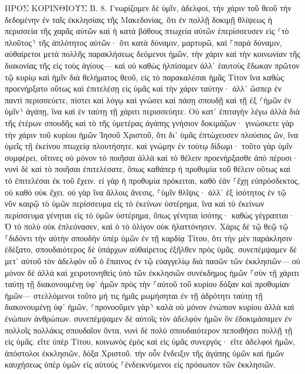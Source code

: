 \documentclass[twoside, 9pt]{extreport}
\begin{document}
ΠΡΟΣ ΚΟΡΙΝΘΙΟΥΣ Β.
8.
Γνωρίζομεν δὲ ὑμῖν, ἀδελφοί, τὴν χάριν τοῦ θεοῦ τὴν δεδομένην ἐν ταῖς ἐκκλησίαις τῆς Μακεδονίας, 
ὅτι ἐν πολλῇ δοκιμῇ θλίψεως ἡ περισσεία τῆς χαρᾶς αὐτῶν καὶ ἡ κατὰ βάθους πτωχεία αὐτῶν ἐπερίσσευσεν εἰς ⸂τὸ πλοῦτος⸃ τῆς ἁπλότητος αὐτῶν· 
ὅτι κατὰ δύναμιν, μαρτυρῶ, καὶ ⸀παρὰ δύναμιν, αὐθαίρετοι 
μετὰ πολλῆς παρακλήσεως δεόμενοι ἡμῶν, τὴν χάριν καὶ τὴν κοινωνίαν τῆς διακονίας τῆς εἰς τοὺς ἁγίους— 
καὶ οὐ καθὼς ἠλπίσαμεν ἀλλ᾽ ἑαυτοὺς ἔδωκαν πρῶτον τῷ κυρίῳ καὶ ἡμῖν διὰ θελήματος θεοῦ, 
εἰς τὸ παρακαλέσαι ἡμᾶς Τίτον ἵνα καθὼς προενήρξατο οὕτως καὶ ἐπιτελέσῃ εἰς ὑμᾶς καὶ τὴν χάριν ταύτην· 
ἀλλ᾽ ὥσπερ ἐν παντὶ περισσεύετε, πίστει καὶ λόγῳ καὶ γνώσει καὶ πάσῃ σπουδῇ καὶ τῇ ἐξ ⸂ἡμῶν ἐν ὑμῖν⸃ ἀγάπῃ, ἵνα καὶ ἐν ταύτῃ τῇ χάριτι περισσεύητε. 
Οὐ κατ᾽ ἐπιταγὴν λέγω ἀλλὰ διὰ τῆς ἑτέρων σπουδῆς καὶ τὸ τῆς ὑμετέρας ἀγάπης γνήσιον δοκιμάζων· 
γινώσκετε γὰρ τὴν χάριν τοῦ κυρίου ἡμῶν Ἰησοῦ Χριστοῦ, ὅτι δι᾽ ὑμᾶς ἐπτώχευσεν πλούσιος ὤν, ἵνα ὑμεῖς τῇ ἐκείνου πτωχείᾳ πλουτήσητε. 
καὶ γνώμην ἐν τούτῳ δίδωμι· τοῦτο γὰρ ὑμῖν συμφέρει, οἵτινες οὐ μόνον τὸ ποιῆσαι ἀλλὰ καὶ τὸ θέλειν προενήρξασθε ἀπὸ πέρυσι· 
νυνὶ δὲ καὶ τὸ ποιῆσαι ἐπιτελέσατε, ὅπως καθάπερ ἡ προθυμία τοῦ θέλειν οὕτως καὶ τὸ ἐπιτελέσαι ἐκ τοῦ ἔχειν. 
εἰ γὰρ ἡ προθυμία πρόκειται, καθὸ ἐὰν ⸀ἔχῃ εὐπρόσδεκτος, οὐ καθὸ οὐκ ἔχει. 
οὐ γὰρ ἵνα ἄλλοις ἄνεσις, ⸀ὑμῖν θλῖψις· ἀλλ᾽ ἐξ ἰσότητος 
ἐν τῷ νῦν καιρῷ τὸ ὑμῶν περίσσευμα εἰς τὸ ἐκείνων ὑστέρημα, ἵνα καὶ τὸ ἐκείνων περίσσευμα γένηται εἰς τὸ ὑμῶν ὑστέρημα, ὅπως γένηται ἰσότης· 
καθὼς γέγραπται· Ὁ τὸ πολὺ οὐκ ἐπλεόνασεν, καὶ ὁ τὸ ὀλίγον οὐκ ἠλαττόνησεν. 
Χάρις δὲ τῷ θεῷ τῷ ⸀διδόντι τὴν αὐτὴν σπουδὴν ὑπὲρ ὑμῶν ἐν τῇ καρδίᾳ Τίτου, 
ὅτι τὴν μὲν παράκλησιν ἐδέξατο, σπουδαιότερος δὲ ὑπάρχων αὐθαίρετος ἐξῆλθεν πρὸς ὑμᾶς. 
συνεπέμψαμεν δὲ μετ᾽ αὐτοῦ τὸν ἀδελφὸν οὗ ὁ ἔπαινος ἐν τῷ εὐαγγελίῳ διὰ πασῶν τῶν ἐκκλησιῶν— 
οὐ μόνον δὲ ἀλλὰ καὶ χειροτονηθεὶς ὑπὸ τῶν ἐκκλησιῶν συνέκδημος ἡμῶν ⸀σὺν τῇ χάριτι ταύτῃ τῇ διακονουμένῃ ὑφ᾽ ἡμῶν πρὸς τὴν ⸀αὐτοῦ τοῦ κυρίου δόξαν καὶ προθυμίαν ἡμῶν— 
στελλόμενοι τοῦτο μή τις ἡμᾶς μωμήσηται ἐν τῇ ἁδρότητι ταύτῃ τῇ διακονουμένῃ ὑφ᾽ ἡμῶν, 
⸂προνοοῦμεν γὰρ⸃ καλὰ οὐ μόνον ἐνώπιον κυρίου ἀλλὰ καὶ ἐνώπιον ἀνθρώπων. 
συνεπέμψαμεν δὲ αὐτοῖς τὸν ἀδελφὸν ἡμῶν ὃν ἐδοκιμάσαμεν ἐν πολλοῖς πολλάκις σπουδαῖον ὄντα, νυνὶ δὲ πολὺ σπουδαιότερον πεποιθήσει πολλῇ τῇ εἰς ὑμᾶς. 
εἴτε ὑπὲρ Τίτου, κοινωνὸς ἐμὸς καὶ εἰς ὑμᾶς συνεργός· εἴτε ἀδελφοὶ ἡμῶν, ἀπόστολοι ἐκκλησιῶν, δόξα Χριστοῦ. 
τὴν οὖν ἔνδειξιν τῆς ἀγάπης ὑμῶν καὶ ἡμῶν καυχήσεως ὑπὲρ ὑμῶν εἰς αὐτοὺς ⸀ἐνδεικνύμενοι εἰς πρόσωπον τῶν ἐκκλησιῶν. 
\end{document}
